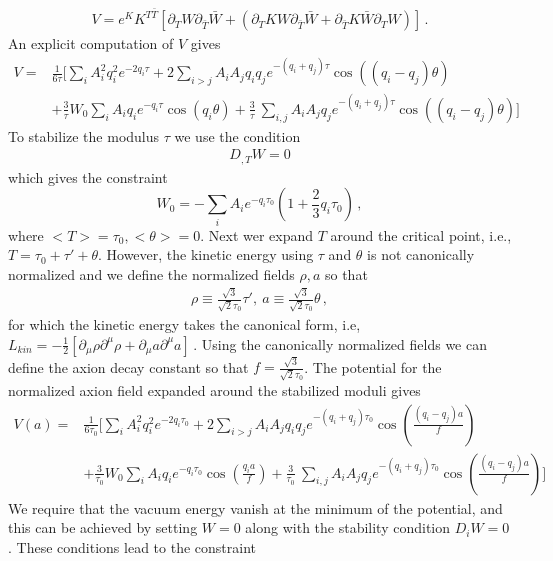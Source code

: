 \documentclass[12pt]{article}
\begin{document}
\begin{align}
  V=  e^K K^{T\bar T} \left[\partial_TW \partial_{\bar T} \bar W +
    (\partial_TK   W \partial_{\bar T} \bar W +
    \partial_{\bar  T} K  \bar W \partial_{T}  W) \right]\,.
\end{align}
An  explicit computation of $V$ gives
\begin{align}
  V= & \frac{1}{6\tau} \Big [  \sum_{i} A^2_i q^2_i  e^{- 2q_i \tau } + 2 \sum_{i>j} A_iA_j q_iq_j e^{-(q_i+q_j)\tau} \cos\left((q_i-q_j) \theta\right)\nonumber\\
     & +  \frac{3}{\tau}  W_0 \sum_i A_i q_i e^{-q_i \tau} \cos(q_i \theta)
    +  \frac{3}{\tau} \
    \sum_{i,j}  A_i A_j q_j  e^{-(q_i + q_j) \tau} \cos((q_i -q_j)\theta)
    \Big]
  \label{11}
\end{align}
To stabilize the modulus $\tau$ we use the condition~\cite{Nath:1983aw}
\begin{align}
  D_{,T} W =0
  \label{33.1}
\end{align}
which gives the constraint
\begin{equation}\label{eqn:crit}
  W_0 = -\sum_i A_i e^{-q_i\tau_0} \left(1 + \frac{2}{3} q_i \tau_0\right)\, ,
\end{equation}
where $<T>=\tau_0, <\theta>=0$.
Next wer  expand $T$  around the critical point, i.e.,
$T= \tau_0 + \tau' +  \theta$. However, the kinetic energy  using  $\tau$ and $\theta$ is not canonically normalized
and  we define the normalized fields $\rho, a$ so that
\begin{align}
  \rho \equiv \frac{\sqrt 3}{\sqrt 2 \tau_0} \tau',~ a \equiv  \frac{\sqrt 3}{\sqrt 2 \tau_0}\theta\,,
  \label{19}
\end{align}
for which the kinetic energy takes the canonical  form, i.e,
$L_{kin}=
  - \frac{1}{2}
  \left[\partial_\mu \rho \partial^\mu \rho + \partial_\mu a \partial^\mu a\right]\,.$  Using the canonically normalized fields
we can  define the axion decay constant  so that  $f=  \frac{\sqrt 3}{\sqrt 2 \tau_0}$.
The potential for the normalized axion field expanded around the stabilized moduli gives
\begin{align}
  V(a)= & \frac{1}{6\tau_0} \Big [  \sum_{i} A^2_i q^2_i  e^{- 2q_i \tau_0 } + 2 \sum_{i>j} A_iA_j q_iq_j e^{-(q_i+q_j)\tau_0}
    \cos\left(\frac{(q_i-q_j) a}{f}\right)\nonumber\\
        & +  \frac{3}{\tau_0}  W_0 \sum_i A_i q_i e^{-q_i \tau_0} \cos(\frac{q_i a}{f})
    +  \frac{3}{\tau_0} \
    \sum_{i,j}  A_i A_j q_j  e^{-(q_i + q_j) \tau_0} \cos\left(\frac{(q_i -q_j)a}{f}\right)
    \Big]
  \label{24}
\end{align}
We require that the vacuum energy vanish at the minimum of the potential, and this can be achieved by setting  $W=0$ along with the
stability condition $D_i W =0$.  These conditions lead to the constraint
\end{document}
